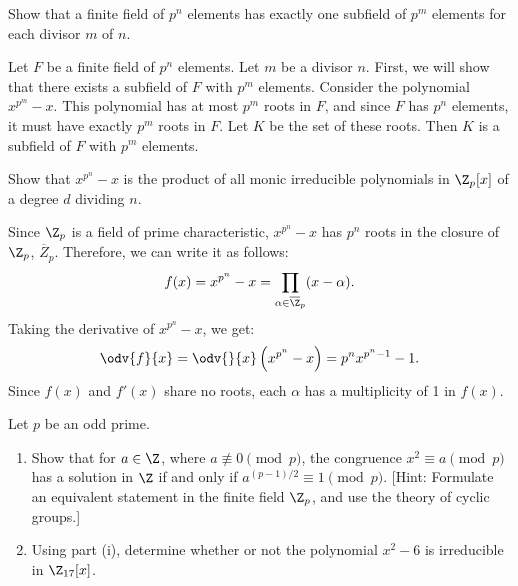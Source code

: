 \begin{problem}[42.12]
  Show that a finite field of $p^n$ elements has exactly one subfield of $p^m$ elements for each divisor $m$ of $n$.
\end{problem}

\begin{solution}
  Let $F$ be a finite field of $p^n$ elements. Let $m$ be a divisor $n$. First, we will show that there exists a subfield of $F$ with $p^m$ elements. Consider the polynomial $x^{p^m} - x$. This polynomial has at most $p^m$ roots in $F$, and since $F$ has $p^n$ elements, it must have exactly $p^m$ roots in $F$. Let $K$ be the set of these roots. Then $K$ is a subfield of $F$ with $p^m$ elements.
\end{solution}

\begin{problem}[42.13]
  Show that $x^{p^n} - x$ is the product of all monic irreducible polynomials in $\Z_p[x]$ of a degree $d$ dividing $n$.
\end{problem}

\begin{solution}
  Since $\Z_p$ is a field of prime characteristic, $x^{p^n} - x$ has $p^n$ roots in the closure of $\Z_p$, $\overline{Z}_p$. Therefore, we can write it as follows:
  \[%
    f(x) = x^{p^n} - x = \prod_{\alpha \in \overline{\Z}_p} (x - \alpha)
  .\]%
  Taking the derivative of $x^{p^n} - x$, we get:
  \[%
    \odv{f}{x} = \odv{}{x} \left(x^{p^n} - x\right) = p^nx^{p^n-1} - 1
  .\]%
  Since $f(x)$ and $f'(x)$ share no roots, each $\alpha$ has a multiplicity of 1 in $f(x)$.
\end{solution}

\begin{problem}[42.14]
  Let $p$ be an odd prime.
  \begin{enumerate}
    \item Show that for $a \in \Z$, where $a \not\equiv 0 \pmod{p}$, the congruence $x^2 \equiv a \pmod{p}$ has a solution in $\Z$ if and only if $a^{(p-1)/2} \equiv 1 \pmod{p}$. [Hint: Formulate an equivalent statement in the finite field $\Z_p$, and use the theory of cyclic groups.]
    \item Using part (i), determine whether or not the polynomial $x^2 - 6$ is irreducible in $\Z_{17}[x]$.
  \end{enumerate}
\end{problem}

